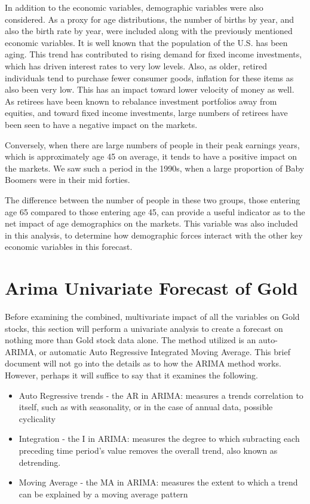 \documentclass[12pt]{article}         %
\begin{document}
In addition to the economic variables, demographic variables were also considered.  As a proxy for age distributions, the number of births by year, and also the birth rate by year, were included along with the previously mentioned economic variables.  It is well known that the population of the U.S. has been aging.  This trend has contributed to rising demand for fixed income investments, which has driven interest rates to very low levels.  Also, as older, retired individuals tend to purchase fewer consumer goods, inflation for these items as also been very low.  This has an impact toward lower velocity of money as well.  As retirees have been known to rebalance investment portfolios away from equities, and toward fixed income investments, large numbers of retirees have been seen to have a negative impact on the markets.  

Conversely, when there are large numbers of people in their peak earnings years, which is approximately age 45 on average, it tends to have a positive impact on the markets.  We saw such a period in the 1990s, when a large proportion of Baby Boomers were in their mid forties.  

The difference between the number of people in these two groups, those entering age 65 compared to those entering age 45, can provide a useful indicator as to the net impact of age demographics on the markets.  This variable was also included in this analysis, to determine how demographic forces interact with the other key economic variables in this forecast.



\section{Arima Univariate Forecast of Gold}

Before examining the combined, multivariate impact of all the variables on Gold stocks, this section will perform a univariate analysis to create a forecast on nothing more than Gold stock data alone.  The method utilized is an auto-ARIMA, or automatic Auto Regressive Integrated Moving Average.  This brief document will not go into the details as to how the ARIMA method works.  However, perhaps it will suffice to say that it examines the following.

\begin{itemize}
\item Auto Regressive trends - the AR in ARIMA: measures a trends correlation to itself, such as with seasonality, or in the case of annual data, possible cyclicality
\item Integration - the I in ARIMA: measures the degree to which subracting each preceding time period's value removes the overall trend, also known as detrending.
\item Moving Average - the MA in ARIMA: measures the extent to which a trend can be explained by a moving average pattern
\end{itemize}
\end{document}
